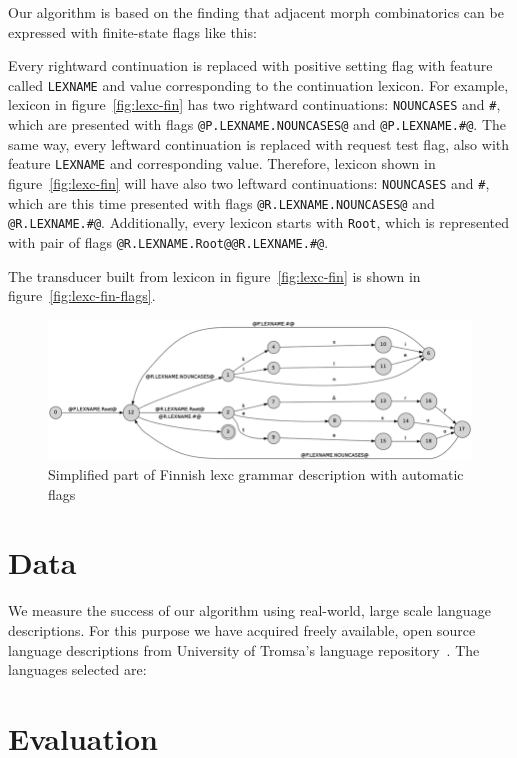 \documentclass[11pt]{article}
\begin{document}
Our algorithm is based on the finding that adjacent morph combinatorics can be expressed with finite-state flags like this:

Every rightward continuation is replaced with positive setting flag with feature called \texttt{LEXNAME} and value corresponding to the continuation lexicon. For example, lexicon in figure~\ref{fig:lexc-fin} has two rightward continuations: \texttt{NOUNCASES} and \texttt{\#}, which are presented with flags \verb+@P.LEXNAME.NOUNCASES@+ and \verb+@P.LEXNAME.#@+. 
The same way, every leftward continuation is replaced with request test flag, also with feature \texttt{LEXNAME} and corresponding value. Therefore, lexicon shown in figure~\ref{fig:lexc-fin} will have also two leftward continuations: \texttt{NOUNCASES} and \texttt{\#}, which are this time presented with flags \verb+@R.LEXNAME.NOUNCASES@+ and \verb+@R.LEXNAME.#@+. Additionally, every lexicon starts with \texttt{Root}, which is represented with pair of flags \verb+@R.LEXNAME.Root@@R.LEXNAME.#@+.

The transducer built from lexicon in figure~\ref{fig:lexc-fin} is shown in figure~\ref{fig:lexc-fin-flags}. 

\begin{figure}
    \includegraphics[width=\textwidth]{transducer.png}
     \caption{Simplified part of Finnish lexc grammar description with automatic flags
     \label{fig:lexc-fin-flag}}
\end{figure}

\section{Data}
\label{sec:data}

We measure the success of our algorithm using real-world, large scale language
descriptions. For this purpose we have acquired freely available, open source
language descriptions from University of Tromsa's language 
repository~\cite{moshagen2013building}. The languages selected are:

\section{Evaluation}
\label{sec:evaluation}
\end{document}
